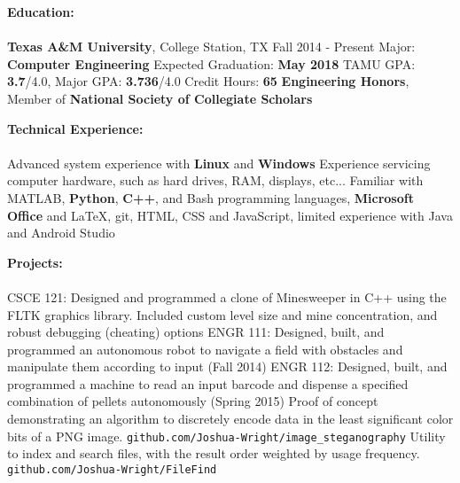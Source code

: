 \documentclass[12pt]{article}
\begin{document}
\begin{flushleft}
\begin{outline}[compactitem]

\newcommand{\upspace}{\vspace{0px}}
\newcommand{\zzz}[1]{\upspace \0 \textbf{#1} \\ \vspace{-0.8\baselineskip} \hrulefill \vspace{-2px} \\ }
\renewcommand\labelitemii{\labelitemi}
\let\oldOne\1\let\oldTwo\2\let\oldThree\3\let\oldFour\4
\renewcommand{\1}{\upspace \oldOne  }
\renewcommand{\2}{\upspace \oldTwo  }
\renewcommand{\3}{\upspace \oldThree}
\renewcommand{\4}{\upspace \oldFour }

\zzz{Education:}
	\1 \textbf{Texas A\&M University}, College Station, TX \hfill Fall 2014 - Present
		\2 Major: \textbf{Computer Engineering}
		\2 Expected Graduation: \textbf{May 2018}
		\2 TAMU GPA: \textbf{3.7}/4.0, Major GPA: \textbf{3.736}/4.0
		\2 Credit Hours: \textbf{65}
		\2 \textbf{Engineering Honors}, Member of \textbf{National Society of Collegiate Scholars}

\zzz{Technical Experience:}
	\1 Advanced system experience with \textbf{Linux} and \textbf{Windows}
	\1 Experience servicing computer hardware, such as hard drives, RAM, displays, etc...
	\1 Familiar with MATLAB, \textbf{Python}, \textbf{C++}, and Bash programming languages, 
	\textbf{Microsoft Office} and LaTeX, git, HTML, CSS and JavaScript, limited experience with Java and Android Studio

\zzz{Projects:}
	\1 CSCE 121: Designed and programmed a clone of Minesweeper in C++ using the FLTK graphics library. Included custom level size and mine concentration, and robust debugging (cheating) options
	\1 ENGR 111: Designed, built, and programmed an autonomous robot to navigate 
	a field with obstacles and manipulate them according to input (Fall 2014)
	\1 ENGR 112: Designed, built, and programmed a machine to read an input 
	barcode and dispense a specified combination of pellets autonomously (Spring 2015)
	\1 Proof of concept demonstrating an algorithm to discretely encode data in the least significant color bits of a PNG image.
		\verb|github.com/Joshua-Wright/image_steganography|
	\1 Utility to index and search files, with the result order weighted by usage frequency.
		\verb|github.com/Joshua-Wright/FileFind|


\end{outline}
\end{flushleft}
\end{document}
